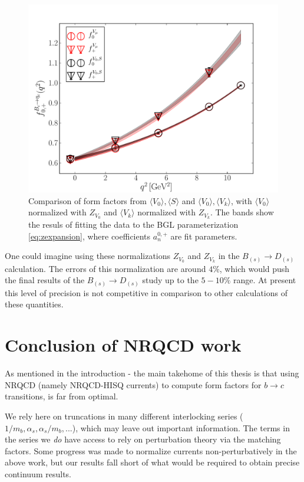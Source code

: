 \begin{figure}[htb!]
\centering
\includegraphics[scale=0.55]{images/nrqcd/Bcetac_bothways_3.pdf}
\caption{Comparison of form factors from $\langle V_0 \rangle, \langle S \rangle$ and $\langle V_0 \rangle,\langle V_k \rangle$, with $\langle V_0 \rangle$ normalized with $Z_{V_0}$ and $\langle V_k \rangle$ normalized with $Z_{V_k}$. The bands show the resuls of fitting the data to the BGL parameterization \eqref{eq:zexpansion}, where coefficients $a^{0,+}_n$ are fit parameters. \label{fig:identicle}}
\end{figure}

One could imagine using these normalizations $Z_{V_0}$ and $Z_{V_k}$ in the $B_{(s)}\to D_{(s)}$ calculation. The errors of this normalization are around $4\%$, which would push the final results of the $B_{(s)}\to D_{(s)}$ study up to the $5-10\%$ range. At present this level of precision is not competitive in comparison to other calculations of these quantities.

\section{Conclusion of NRQCD work}

As mentioned in the introduction - the main takehome of this thesis is that using NRQCD (namely NRQCD-HISQ currents) to compute form factors for $b\to c$ transitions, is far from optimal. 

We rely here on truncations in many different interlocking series ($1/m_b, \alpha_s,\alpha_s/m_b,...$), which may leave out important information. The terms in the series we {\textit{do}} have access to rely on perturbation theory via the matching factors. Some progress was made to normalize currents non-perturbatively in the above work, but our results fall short of what would be required to obtain precise continuum results.

